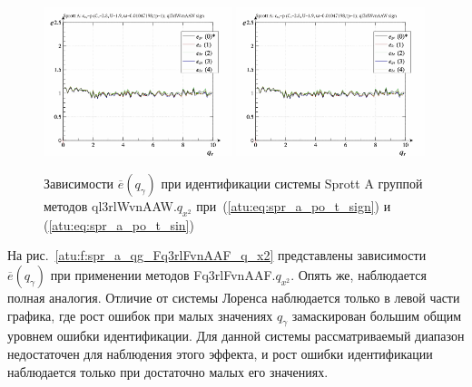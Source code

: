 \begin{figure}[htb!]
  \centerline{
    \includegraphics[width=0.49\textwidth]{p/cha/spr_a/ql3rlWvnAAW_x2/sprott_a_id-p_q_gamma_sign.png}
    \hfill
    \includegraphics[width=0.49\textwidth]{p/cha/spr_a/ql3rlWvnAAW_x2/sprott_a_id-p_q_gamma_sign.png}
  }
  \caption{Зависимости $\overline{e}(q_\gamma)$ при идентификации системы Sprott A группой методов ql3rlWvnAAW.$q_{x^2}$
   при~(\ref{atu:eq:spr_a_po_t_sign}) и (\ref{atu:eq:spr_a_po_t_sin})}
  \label{atu:f:spr_a_ql3rlWvnAAW_q_x2}
\end{figure}

На рис.~\ref{atu:f:spr_a_qg_Fq3rlFvnAAF_q_x2} представлены зависимости
$\overline{e}(q_\gamma)$ при применении методов Fq3rlFvnAAF.$q_{x^2}$.
Опять же, наблюдается полная аналогия. Отличие от системы Лоренса наблюдается только
в левой части графика, где рост ошибок при
малых значениях $q_\gamma$ замаскирован большим общим уровнем ошибки идентификации.
Для данной системы рассматриваемый диапазон недостаточен для наблюдения этого эффекта,
и рост ошибки идентификации наблюдается только при достаточно малых его значениях.

